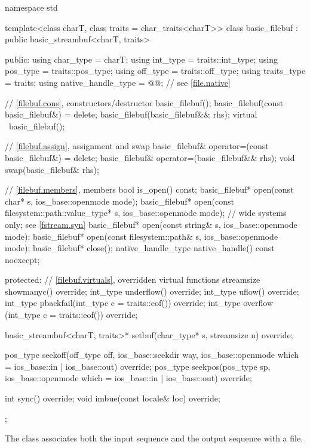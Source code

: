 %
\begin{codeblock}
namespace std {
  template<class charT, class traits = char_traits<charT>>
  class basic_filebuf : public basic_streambuf<charT, traits> {
  public:
    using char_type   = charT;
    using int_type    = traits::int_type;
    using pos_type    = traits::pos_type;
    using off_type    = traits::off_type;
    using traits_type = traits;
    using native_handle_type = @@;   // see \ref{file.native}

    // \ref{filebuf.cons}, constructors/destructor
    basic_filebuf();
    basic_filebuf(const basic_filebuf&) = delete;
    basic_filebuf(basic_filebuf&& rhs);
    virtual ~basic_filebuf();

    // \ref{filebuf.assign}, assignment and swap
    basic_filebuf& operator=(const basic_filebuf&) = delete;
    basic_filebuf& operator=(basic_filebuf&& rhs);
    void swap(basic_filebuf& rhs);

    // \ref{filebuf.members}, members
    bool is_open() const;
    basic_filebuf* open(const char* s, ios_base::openmode mode);
    basic_filebuf* open(const filesystem::path::value_type* s,
                        ios_base::openmode mode);   // wide systems only; see \ref{fstream.syn}
    basic_filebuf* open(const string& s, ios_base::openmode mode);
    basic_filebuf* open(const filesystem::path& s, ios_base::openmode mode);
    basic_filebuf* close();
    native_handle_type native_handle() const noexcept;

  protected:
    // \ref{filebuf.virtuals}, overridden virtual functions
    streamsize showmanyc() override;
    int_type underflow() override;
    int_type uflow() override;
    int_type pbackfail(int_type c = traits::eof()) override;
    int_type overflow (int_type c = traits::eof()) override;

    basic_streambuf<charT, traits>* setbuf(char_type* s, streamsize n) override;

    pos_type seekoff(off_type off, ios_base::seekdir way,
                     ios_base::openmode which = ios_base::in | ios_base::out) override;
    pos_type seekpos(pos_type sp,
                     ios_base::openmode which = ios_base::in | ios_base::out) override;

    int sync() override;
    void imbue(const locale& loc) override;
  };
}
\end{codeblock}

\pnum
The class
associates both the input sequence and the output
sequence with a file.

